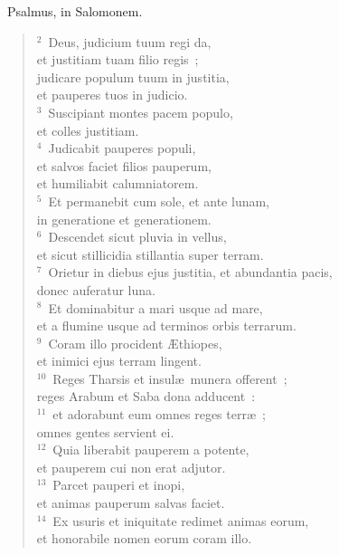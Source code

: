 ~\lettrine[lines=10,image=true,loversize=0.05,lraise=-0.03]{P}{}salmus, in Salomonem.
\begin{flushleft}\begin{verse}\vspace{6pt}${}^{2}$~Deus, judicium tuum regi da,\\ et justitiam tuam filio regis~;\\ judicare populum tuum in justitia,\\ et pauperes tuos in judicio.\\
${}^{3}$~Suscipiant montes pacem populo,\\ et colles justitiam.\\
${}^{4}$~Judicabit pauperes populi,\\ et salvos faciet filios pauperum,\\ et humiliabit calumniatorem.\\
${}^{5}$~Et permanebit cum sole, et ante lunam,\\ in generatione et generationem.\\
${}^{6}$~Descendet sicut pluvia in vellus,\\ et sicut stillicidia stillantia super terram.\\
${}^{7}$~Orietur in diebus ejus justitia, et abundantia pacis,\\ donec auferatur luna.\\
${}^{8}$~Et dominabitur a mari usque ad mare,\\ et a flumine usque ad terminos orbis terrarum.\\
${}^{9}$~Coram illo procident \AE thiopes,\\ et inimici ejus terram lingent.\\
${}^{10}$~Reges Tharsis et insul\ae\ munera offerent~;\\ reges Arabum et Saba dona adducent~:\\
${}^{11}$~et adorabunt eum omnes reges terr\ae~;\\ omnes gentes servient ei.\\
${}^{12}$~Quia liberabit pauperem a potente,\\ et pauperem cui non erat adjutor.\\
${}^{13}$~Parcet pauperi et inopi,\\ et animas pauperum salvas faciet.\\
${}^{14}$~Ex usuris et iniquitate redimet animas eorum,\\ et honorabile nomen eorum coram illo.\\

\end{verse}
\end{flushleft}
